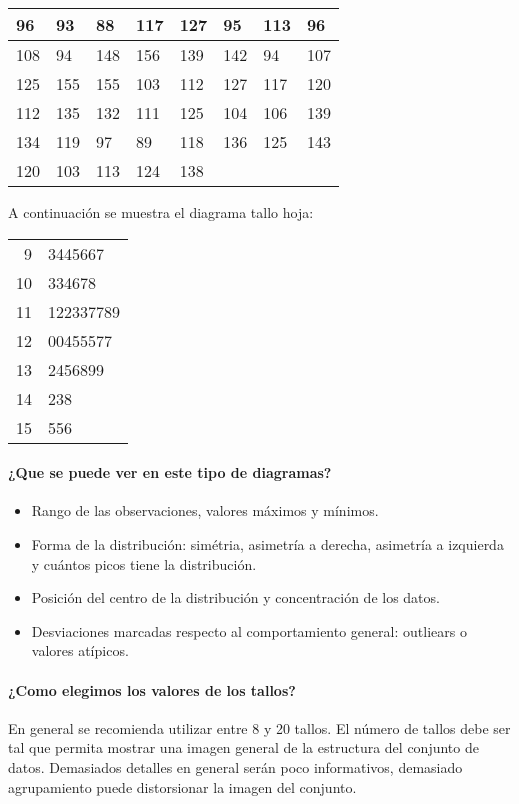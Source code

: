 \begin{center}
\begin{tabular}{|l|l|l|l|l|l|l|l|}
	\hline
	96 & 93 & 88 & 117 & 127 & 95 & 113 & 96 \\
	\hline
	108 & 94 & 148 & 156 & 139 & 142 & 94 & 107 \\
	\hline
	125 & 155 & 155 & 103 & 112 & 127 & 117 & 120 \\
	\hline
	112 & 135 & 132 & 111 & 125 & 104 & 106 & 139 \\
	\hline
	134 & 119 & 97 & 89 & 118 & 136 & 125 & 143 \\
	\hline
	120 & 103 & 113 & 124 & 138 &   &   &  \\
	\hline
\end{tabular}

\vspace*{5mm}
A continuación se muestra el diagrama tallo hoja:

\vspace*{5mm}
\begin{tabular}{r|l}
	9 & 3445667\\
	10 & 334678\\
	11 & 122337789\\
	12 & 00455577\\
	13 & 2456899\\
	14 & 238\\
	15 & 556\\
\end{tabular}
\end{center}

\paragraph{¿Que se puede ver en este tipo de diagramas?}
\begin{itemize}
	\item Rango de las observaciones, valores máximos y mínimos.
	\item Forma de la distribución: simétria, asimetría a derecha, asimetría a izquierda y cuántos picos tiene la distribución.
	\item Posición del centro de la distribución y concentración de los datos.
	\item Desviaciones marcadas respecto al comportamiento general: outliears o valores atípicos.
\end{itemize}
\paragraph{¿Como elegimos los valores de los tallos?}
En general se recomienda utilizar entre 8 y 20 tallos. El número de tallos debe ser tal que permita mostrar una imagen general de la estructura del conjunto de datos. Demasiados detalles en general serán poco informativos, demasiado agrupamiento puede distorsionar la imagen del conjunto.

